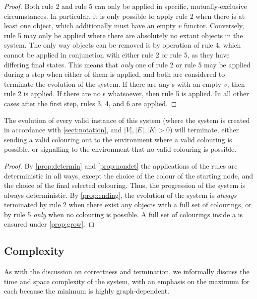 \begin{proof}
Both rule 2 and rule 5 can only be applied in specific, mutually-exclusive circumstances.  In particular, it is only possible to apply rule 2 when there is at least one \bo{} object, which additionally must have an empty \(v\) functor.  Conversely, rule 5 may only be applied where there are absolutely no extant \bo{} objects in the system.  The only way \bo{} objects can be removed is by operation of rule 4, which cannot be applied in conjunction with either rule 2 or rule 5, as they have differing final states.  This means that \emph{only} one of rule 2 or rule 5 may be applied during a step when either of them is applied, and both are considered to terminate the evolution of the system.  If there are any \bo{}s with an empty \(v\), then rule 2 is applied.  If there are no \bo{}s whatsoever, then rule 5 is applied.  In all other cases after the first step, rules 3, 4, and 6 are applied.
\end{proof}

\begin{theorem}
The evolution of every valid instance of this system (where the system is created in accordance with \autoref{sect:notation}, and \(|V|, |E|, |K| > 0\)) will terminate, either sending a valid colouring out to the environment where a valid colouring is possible, or signalling to the environment that no valid colouring is possible.
\end{theorem}

\begin{proof}
By \autoref{prop:determin} and \autoref{prop:nondet} the applications of the rules are deterministic in all ways, except the choice of the colour of the starting node, and the choice of the final selected colouring.  Thus, the progression of the system is always deterministic.  By \autoref{prop:ending}, the evolution of the system is \emph{always} terminated by rule 2 when there exist any \bo{} objects with a full set of colourings, or by rule 5 \emph{only} when no colouring is possible.  A full set of colourings inside a \bo{} is ensured under \autoref{prop:grow}.
\end{proof}

\subsection{Complexity}
As with the discussion on correctness and termination, we informally discuss the time and space complexity of the system, with an emphasis on the maximum for each because the minimum is highly graph-dependent.

